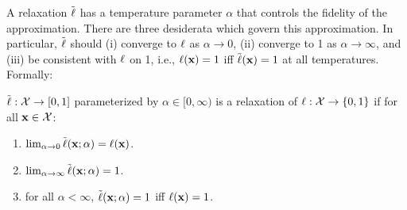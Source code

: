 A relaxation $\mathrel{\tilde{\operatorname{\ell}}}$ has a temperature parameter $\alpha$ that controls the fidelity of the approximation.
There are three desiderata which govern this approximation.
In particular, $\mathrel{\tilde{\operatorname{\ell}}}$ should (i) converge to $\operatorname{\ell}$ as $\alpha \to 0$, (ii) converge to 1 as $\alpha \to \infty$, and (iii) be consistent with $\operatorname{\ell}$ on 1, i.e., $\operatorname{\ell}(\mathbf{x}) = 1$ iff $\tilde{\operatorname{\ell}}(\mathbf{x}) = 1$ at all temperatures.  
Formally:



\begin{definition}
$\tilde{\operatorname{\ell}} : {\mathcal{X}} \to [0, 1]$ parameterized by $\alpha \in [0, \infty)$ is a relaxation of $\operatorname{\ell}: {\mathcal{X}} \to \{0, 1\}$ if for all $\mathbf{x} \in {\mathcal{X}}$:
\begin{enumerate}[label=(\roman*)]
	\label{def:temp}
	\item $\lim_{\alpha \to 0}\tilde{\operatorname{\ell}}(\mathbf{x}; \alpha) = \operatorname{\ell}(\mathbf{x})$.
	\item $\lim_{\alpha \to \infty}\tilde{\operatorname{\ell}}(\mathbf{x}; \alpha) = 1$.
  \item for all $\alpha < \infty$, $\tilde{\operatorname{\ell}}(\mathbf{x}; \alpha) = 1$ iff $\operatorname{\ell}(\mathbf{x}) = 1$.
\end{enumerate}
\end{definition}


